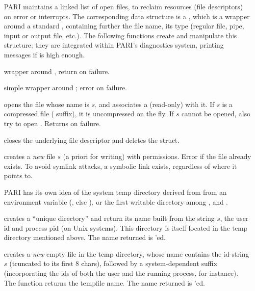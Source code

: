 PARI maintains a linked list of open files, to reclaim resources
(file descriptors) on error or interrupts. The corresponding data structure
is a , which is a wrapper around a standard ,
containing further the file name, its type (regular file, pipe, input or
output file, etc.). The following functions create and manipulate this
structure; they are integrated within PARI's diagnostics system, printing
messages if  is high enough.

 wrapper
around , return  on failure.

simple wrapper around ; error on failure.

 opens the file whose name is
$s$,  and associates a (read-only)  with it. If $s$ is a
compressed file ( suffix), it is uncompressed on the fly.
If $s$ cannot be opened, also try to open . Returns 
on failure.

 closes
the underlying file descriptor and deletes the  struct.

creates a \emph{new} file $s$ (a priori for writing) with 
permissions. Error if the file already exists. To avoid symlink attacks,
a symbolic link exists, regardless of where it points to.


PARI has its own idea of the system temp directory derived from from an
environment variable (, else ), or the first
writable directory among ,  and .

 creates a ``unique directory''
and return its name built from the string $s$, the user id and process pid
(on Unix systems). This directory is itself located in the temp
directory mentioned above. The name returned is 'ed.

 creates a \emph{new} empty
file in the temp directory, whose name contains the id-string $s$ (truncated
to its first $8$ chars), followed by a system-dependent suffix (incorporating
the ids of both the user and the running process, for instance). The function
returns the tempfile name. The name returned is 'ed.

